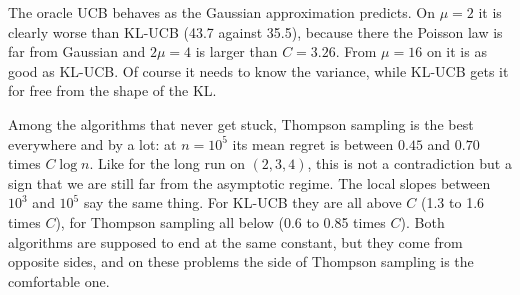 The oracle UCB behaves as the Gaussian approximation predicts. On $\mu = 2$ it is clearly worse than KL-UCB (43.7 against 35.5), because there the Poisson law is far from Gaussian and $2\mu = 4$ is larger than $C = 3.26$. From $\mu = 16$ on it is as good as KL-UCB. Of course it needs to know the variance, while KL-UCB gets it for free from the shape of the KL.

Among the algorithms that never get stuck, Thompson sampling is the best everywhere and by a lot: at $n = 10^5$ its mean regret is between $0.45$ and $0.70$ times $C\log n$. Like for the long run on $(2, 3, 4)$, this is not a contradiction but a sign that we are still far from the asymptotic regime. The local slopes between $10^3$ and $10^5$ say the same thing. For KL-UCB they are all above $C$ (1.3 to 1.6 times $C$), for Thompson sampling all below (0.6 to 0.85 times $C$). Both algorithms are supposed to end at the same constant, but they come from opposite sides, and on these problems the side of Thompson sampling is the comfortable one.

